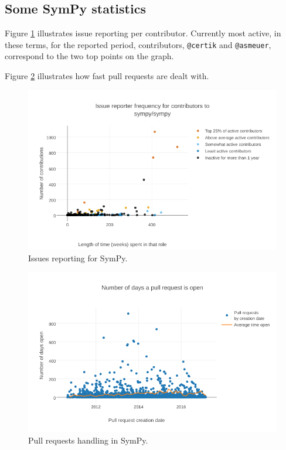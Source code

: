 \documentclass{deliverablereport}
\begin{document}
\subsection*{Some SymPy statistics}
Figure \ref{wp7:fig:sympyissues} illustrates issue reporting
per contributor.
Currently most active, in these terms,
for the reported period, contributors, {\tt @certik} and {\tt @asmeuer}, 
correspond to the two top points on the graph. 

Figure \ref{wp7:fig:sympypulls} illustrates how fast pull
requests are dealt with.

\begin{figure}[ht]
  \includegraphics[width=\textwidth]{sympy-issuereporting}
    \caption{Issues reporting for SymPy. 
    \label{wp7:fig:sympyissues}}
\end{figure}

\begin{figure}[ht]
  \includegraphics[width=\textwidth]{sympy-pullrequests}
    \caption{Pull requests handling in SymPy.\label{wp7:fig:sympypulls}}
\end{figure}

\newpage

\printbibliography
\end{document}
